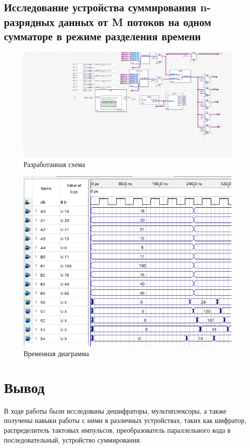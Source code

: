 \documentclass[a4paper,12pt]{article}
\begin{document}
    \subsection{Исследование устройства суммирования n-разрядных данных от M потоков на одном сумматоре в режиме разделения времени}
    \begin{figure}[H]
        \centering
        \includegraphics[width=\linewidth]{scheme_last}
        \caption{Разработанная схема}
    \end{figure}
    \begin{figure}[H]
        \centering
        \includegraphics[width=0.7\linewidth]{wave_last}
        \caption{Временная диаграмма}
    \end{figure}
    
    \section{Вывод}
    В ходе работы были исследованы дешифраторы, мультиплексоры, а также получены навыки работы с ними в различных
    устройствах, таких как шифратор, распределитель тактовых импульсов, преобразователь параллельного кода в последовательный,
    устройство суммирования.
\end{document}
